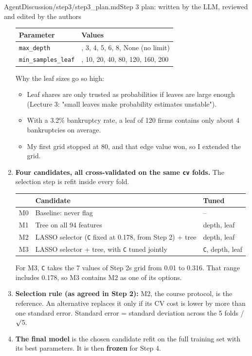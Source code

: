 \begin{mdfile}{AgentDiscussion/\allowbreak{}step3/\allowbreak{}step3\_plan.md}{Step 3 plan: written by the LLM, reviewed and edited by the authors}
\begin{enumerate}
  {\def\LTcaptype{none} %
  \begin{tabularx}{\linewidth}{@{}l>{\raggedright\arraybackslash}X@{}}
  \toprule\noalign{}
  Parameter & Values \\
  \midrule\noalign{}
  \texttt{max\_depth} & 2, 3, 4, 5, 6, 8, None (no limit) \\
  \texttt{min\_samples\_leaf} & 1, 10, 20, 40, 80, 120, 160, 200 \\
  \bottomrule
\end{tabularx}
  }

  Why the leaf sizes go so high:

  \begin{itemize}
  \tightlist
  \item
    Leaf shares are only trusted as probabilities if leaves are large enough (Lecture 3: "small leaves make probability estimates unstable").
  \item
    With a 3.2\% bankruptcy rate, a leaf of 120 firms contains only about 4 bankruptcies on average.
  \item
    My first grid stopped at 80, and that edge value won, so I extended the grid.
  \end{itemize}
\item
  \textbf{Four candidates, all cross-validated on the same \texttt{cv} folds.} The selection step is refit inside every fold.

  {\def\LTcaptype{none} %
  \begin{tabularx}{\linewidth}{@{}l>{\raggedright\arraybackslash}X>{\raggedright\arraybackslash}X@{}}
  \toprule\noalign{}
  & Candidate & Tuned \\
  \midrule\noalign{}
  M0 & Baseline: never flag & -- \\
  M1 & Tree on all 94 features & depth, leaf \\
  M2 & LASSO selector (\texttt{C} fixed at 0.178, from Step 2) + tree & depth, leaf \\
  M3 & LASSO selector + tree, with \texttt{C} tuned jointly & \texttt{C}, depth, leaf \\
  \bottomrule
\end{tabularx}
  }

  For M3, \texttt{C} takes the 7 values of Step 2\textquotesingle s grid from 0.01 to 0.316. That range includes 0.178, so M3 contains M2 as one of its options.
\item
  \textbf{Selection rule (as agreed in Step 2):} M2, the course protocol, is the reference. An alternative replaces it only if its CV cost is lower by more than one standard error. Standard error = standard deviation across the 5 folds / \ensuremath{\surd}5.
\item
  \textbf{The final model} is the chosen candidate refit on the full training set with its best parameters. It is then \textbf{frozen} for Step 4.
\end{enumerate}


\end{mdfile}
